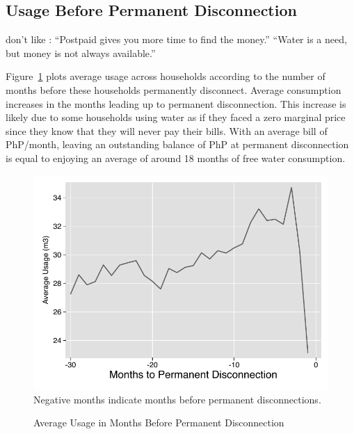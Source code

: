\documentclass[12pt]{article}
\begin{document}
\subsection{Usage Before Permanent Disconnection}\label{appendix:permanentdc}



don't like : “Postpaid gives you more time to find the money.”  “Water is a need, but money is not always available.”



Figure~\ref{figure:dc_permanent} plots average usage across households according to the number of months before these households permanently disconnect. Average consumption increases in the months leading up to permanent disconnection.  This increase is likely due to some households using water as if they faced a zero marginal price since they know that they will never pay their bills.  With an average bill of PhP/month, leaving an outstanding balance of PhP at permanent disconnection is equal to enjoying an average of around 18 months of free water consumption.

\begin{figure}[H]
\centering
\caption{Average Usage in Months Before Permanent Disconnection}\label{figure:dc_permanent}
\includegraphics[scale=.7]{tables/line_disc_graph.pdf} \\
{ \footnotesize Negative months indicate months before permanent disconnections. }
\end{figure}
\end{document}
